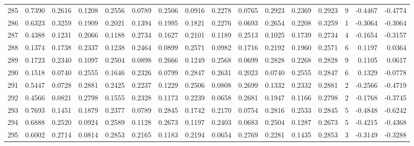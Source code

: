 \begin{tabular}{lrrrrrrrrrrrrrrr}
285 &      0.7390 &  0.2616 &  0.1208 &  0.2556 &  0.0789 &  0.2506 &  0.0916 &  0.2278 &  0.0765 &  0.2923 &   0.2369 &     0.2923 &      9 &                   -0.4467 &                    -0.4774 \\
286 &      0.6323 &  0.3259 &  0.1909 &  0.2021 &  0.1394 &  0.1995 &  0.1821 &  0.2276 &  0.0693 &  0.2654 &   0.2208 &     0.3259 &      1 &                   -0.3064 &                    -0.3064 \\
287 &      0.4388 &  0.1231 &  0.2066 &  0.1188 &  0.2734 &  0.1627 &  0.2101 &  0.1189 &  0.2513 &  0.1025 &   0.1739 &     0.2734 &      4 &                   -0.1654 &                    -0.3157 \\
288 &      0.1374 &  0.1738 &  0.2337 &  0.1238 &  0.2464 &  0.0899 &  0.2571 &  0.0982 &  0.1716 &  0.2192 &   0.1960 &     0.2571 &      6 &                    0.1197 &                     0.0364 \\
289 &      0.1723 &  0.2340 &  0.1097 &  0.2504 &  0.0898 &  0.2666 &  0.1249 &  0.2568 &  0.0699 &  0.2828 &   0.2268 &     0.2828 &      9 &                    0.1105 &                     0.0617 \\
290 &      0.1518 &  0.0740 &  0.2555 &  0.1646 &  0.2326 &  0.0799 &  0.2847 &  0.2631 &  0.2023 &  0.0740 &   0.2555 &     0.2847 &      6 &                    0.1329 &                    -0.0778 \\
291 &      0.5447 &  0.0728 &  0.2881 &  0.2425 &  0.2237 &  0.1229 &  0.2506 &  0.0808 &  0.2699 &  0.1332 &   0.2332 &     0.2881 &      2 &                   -0.2566 &                    -0.4719 \\
292 &      0.4566 &  0.0821 &  0.2798 &  0.1555 &  0.2328 &  0.1173 &  0.2239 &  0.0658 &  0.2681 &  0.1947 &   0.1166 &     0.2798 &      2 &                   -0.1768 &                    -0.3745 \\
293 &      0.7693 &  0.1451 &  0.1879 &  0.2377 &  0.0789 &  0.2845 &  0.1742 &  0.2170 &  0.0754 &  0.2816 &   0.2533 &     0.2845 &      5 &                   -0.4848 &                    -0.6242 \\
294 &      0.6888 &  0.2520 &  0.0924 &  0.2589 &  0.1128 &  0.2673 &  0.1197 &  0.2403 &  0.0683 &  0.2504 &   0.1287 &     0.2673 &      5 &                   -0.4215 &                    -0.4368 \\
295 &      0.6002 &  0.2714 &  0.0814 &  0.2853 &  0.2165 &  0.1183 &  0.2194 &  0.0654 &  0.2769 &  0.2281 &   0.1435 &     0.2853 &      3 &                   -0.3149 &                    -0.3288 \\

\end{tabular}
